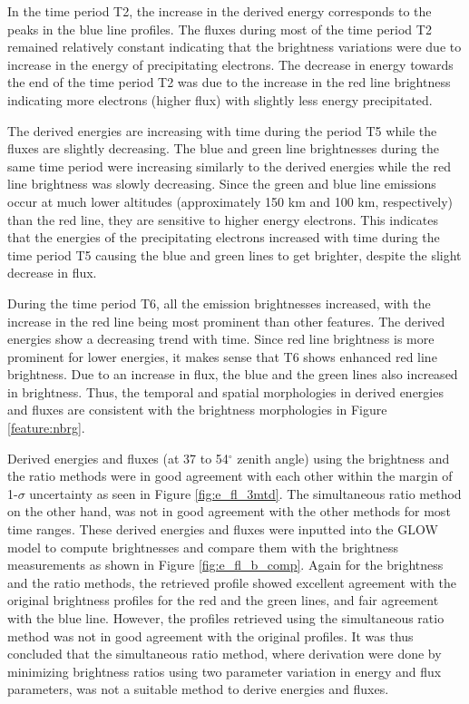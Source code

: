 \documentclass[crop=false,class=mitthesis,oneside,font=12pt]{standalone}
\begin{document}
In the time period T2, the increase in the derived energy corresponds to the peaks in the blue line profiles. The fluxes during most of the time period T2 remained relatively constant indicating that the brightness variations were due to increase in the energy of precipitating electrons. The decrease in energy towards the end of the time period T2 was due to the increase in the red line brightness indicating more electrons (higher flux) with slightly less energy precipitated. 

The derived energies are increasing with time during the period T5 while the fluxes are slightly decreasing. The blue and green line brightnesses during the same time period were increasing similarly to the derived energies while the red line brightness was slowly decreasing. Since the green and blue line emissions occur at much lower altitudes (approximately 150 km and 100 km, respectively) than the red line, they are sensitive to higher energy electrons. This indicates that the energies of the precipitating electrons increased with time during the time period T5 causing the blue and green lines to get brighter, despite the slight decrease in flux.

During the time period T6, all the emission brightnesses increased, with the increase in the red line being most prominent than other features. The derived energies show a decreasing trend with time. Since red line brightness is more prominent for lower energies, it makes sense that T6 shows enhanced red line brightness. Due to an increase in flux, the blue and the green lines also increased in brightness. Thus, the temporal and spatial morphologies in derived energies and fluxes are consistent with the brightness morphologies in Figure \ref{feature:nbrg}. 

Derived energies and fluxes (at 37 to 54$^\circ$ zenith angle) using the brightness and the ratio methods were in good agreement with each other within the margin of 1-$\sigma$ uncertainty as seen in Figure \ref{fig:e_fl_3mtd}. The simultaneous ratio method on the other hand, was not in good agreement with the other methods for most time ranges. These derived energies and fluxes were inputted into the GLOW model to compute brightnesses and compare them with the brightness measurements as shown in Figure \ref{fig:e_fl_b_comp}. Again for the brightness and the ratio methods, the retrieved profile showed excellent agreement with the original brightness profiles for the red and the green lines, and fair agreement with the blue line. However, the profiles retrieved using the simultaneous ratio method was not in good agreement with the original profiles. It was thus concluded that the simultaneous ratio method, where derivation were done by minimizing brightness ratios using two parameter variation in energy and flux parameters, was not a suitable method to derive energies and fluxes.
\end{document}
